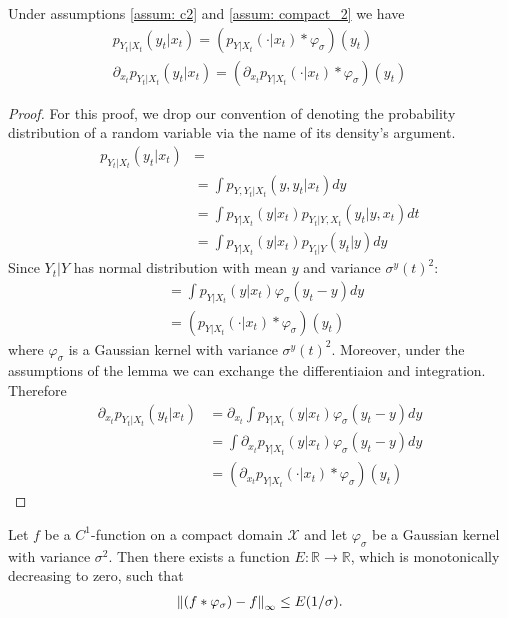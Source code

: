 \begin{lemma}
    \label{lemma: blurring}
    Under assumptions \ref{assum: c2} and \ref{assum: compact_2} we have
    \begin{gather*}
        p_{Y_t | X_t}(y_t | x_t)  = (p_{Y | X_t}(\cdot | x_t) \ast \varphi_\sigma)(y_t) \\
        \partial_{x_t} p_{Y_t | X_t}(y_t | x_t) = (\partial_{x_t} p_{Y| X_t}(\cdot | x_t) \ast \varphi_\sigma)(y_t)
    \end{gather*}
\end{lemma}
\begin{proof}
    For this proof, we drop our convention of denoting the probability distribution of a random variable via the name of its density’s argument.
    \begin{align*}
        p_{Y_t | X_t}(y_t | x_t)  &=
        \\ &= \int p_{Y, Y_t| X_t}(y, y_t | x_t) dy 
        \\ &= \int p_{Y | X_t}(y | x_t) p_{Y_t |Y, X_t}(y_t | y, x_t) dt
        \\ &= \int p_{Y | X_t}(y | x_t) p_{Y_t |Y}(y_t | y) dy
    \end{align*}
    Since $Y_t |Y$ has normal distribution with mean $y$ and variance $\sigma^y(t)^2$:
    \begin{align*}
        &= \int p_{Y | X_t}(y | x_t) \varphi_\sigma(y_t - y)  dy 
        \\ &= (p_{Y | X_t}(\cdot | x_t) \ast \varphi_\sigma)(y_t)
    \end{align*}
    where $\varphi_\sigma$ is a Gaussian kernel with variance $\sigma^y(t)^2$.
    Moreover, under the assumptions of the lemma we can exchange the differentiaion and integration. Therefore
    \begin{align*}
        \partial_{x_t} p_{Y_t | X_t}(y_t | x_t) &= \partial_{x_t} \int p_{Y | X_t}(y | x_t) \varphi_\sigma(y_t - y) dy   
        \\ &=  \int \partial_{x_t} p_{Y | X_t}(y | x_t) \varphi_\sigma(y_t - y) dy  
        \\ &= (\partial_{x_t} p_{Y | X_t}(\cdot | x_t) \ast \varphi_\sigma)(y_t)
    \end{align*}
\end{proof}

\begin{lemma}
    \label{lemma: sup_norm}
    Let $f$ be a $C^1$-function on a compact domain $\mathcal{X}$ and let $\varphi_\sigma$ be a Gaussian kernel with variance $\sigma^2$. Then there exists a function $E: \mathbb{R} \xrightarrow{} \mathbb{R}$, which is monotonically decreasing to zero, such that
    \begin{gather*}
        \left\lVert (f \ast \varphi_\sigma) - f \right\rVert_{\infty} \leq E(1/\sigma).
    \end{gather*}
\end{lemma}

